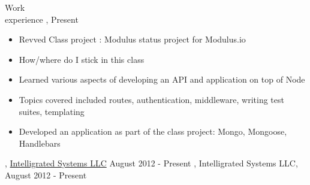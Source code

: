 \begin{category}{Work \\experience}
, Present
\begin{itemize}
\item Revved Class project : Modulus status project for Modulus.io 
\item How/where do I stick in this class
\item Learned various aspects of developing an API and application on top of Node
\item Topics covered included routes, authentication, middleware, writing test suites, templating
\item Developed an application as part of the class project: Mongo, Mongoose, Handlebars
\end{itemize}

\ifWebLinks
{}, \href{http://www.intelligrated.com}{Intelligrated Systems LLC} August 2012 - Present
\else
{}, Intelligrated Systems LLC, August 2012 - Present
\fi 

\begin{itemize}



\end{itemize}
\end{category}

